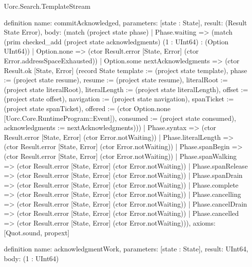 \begin{lexlean}{Uorc.Search.TemplateStream}
\begin{semanticmodule}
definition{
  name: commitAcknowledged,
  parameters: [state : State],
  result: (Result State Error),
  body: (match (project state phase)
    | Phase.waiting => (match (prim checked_add (project state acknowledgments) (1 : UInt64) : (Option UInt64))
      | Option.none => (ctor Result.error [State, Error] (ctor Error.addressSpaceExhausted))
      | Option.some nextAcknowledgments => (ctor Result.ok [State, Error] (record State {template := (project state template), phase := (project state resume), resume := (project state resume), literalRoot := (project state literalRoot), literalLength := (project state literalLength), offset := (project state offset), navigation := (project state navigation), spanTicket := (project state spanTicket), offered := (ctor Option.none [Uorc.Core.RuntimeProgram::Event]), consumed := (project state consumed), acknowledgments := nextAcknowledgments})))
    | Phase.syntax => (ctor Result.error [State, Error] (ctor Error.notWaiting))
    | Phase.literalLength => (ctor Result.error [State, Error] (ctor Error.notWaiting))
    | Phase.spanBegin => (ctor Result.error [State, Error] (ctor Error.notWaiting))
    | Phase.spanWalking => (ctor Result.error [State, Error] (ctor Error.notWaiting))
    | Phase.spanRelease => (ctor Result.error [State, Error] (ctor Error.notWaiting))
    | Phase.spanDrain => (ctor Result.error [State, Error] (ctor Error.notWaiting))
    | Phase.complete => (ctor Result.error [State, Error] (ctor Error.notWaiting))
    | Phase.cancelling => (ctor Result.error [State, Error] (ctor Error.notWaiting))
    | Phase.cancelDrain => (ctor Result.error [State, Error] (ctor Error.notWaiting))
    | Phase.cancelled => (ctor Result.error [State, Error] (ctor Error.notWaiting))),
  axioms: [Quot.sound, propext]
}

definition{
  name: acknowledgmentWork,
  parameters: [state : State],
  result: UInt64,
  body: (1 : UInt64)
}


\end{semanticmodule}
\end{lexlean}
